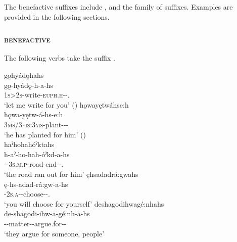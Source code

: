 The benefactive suffixes include , and the  family of suffixes. Examples are provided in the following sections.

\subsubsection{ \textsc{benefactive}} \label{[-hs] (benefactive)}
The following verbs take the  \textsc{\benefactive} suffix .


\ea\label{ex:benefex3}
\ea gǫ̱hyádǫ̱hahs\\
\gll gǫ̱-hyádǫ̱-h-a-hs\\
 \textsc{1s>2s}-write-\textsc{euph.h}-{\joinerA}-\exsc{\benefactive}.{\noaspect} \\
\glt `let me write for you' (\cite{mithun_watewayestanih_1984})
\ex hǫwayętwáhse:h\\
\gll hǫwa-yętw-á-hs-e:h\\
\textsc{3ms/3fis:3ms}-plant-{\joinerA}-{\benefactive}-{\stative}\\
\glt ‘he has planted for him’
(\cite{foster_course_1993})\\

\ex haˀhohahóˀktahs\\
\gll h-aˀ-ho-hah-óˀkd-a-hs\\
 {\translocative}-{\factual}-\textsc{3s.m.p}-road-end-{\joinerA}-{\benefactive}.{\zeropunctual}\\
\glt `the road ran out for him'
\ex ęhsadadrá:gwahs\\
\gll ę-hs-adad-rá:gw-a-hs\\
 \fut-\textsc{2s.a}-{}-choose-{\joinerA}-{\benefactive}.{\zeropunctual}\\
\glt `you will choose for yourself'
\ex deshagodihwagé:nhahs\\
\gll de-shagodi-ihw-a-gé:nh-a-hs\\
 {\dualic}--matter-{\joinerA}-argue.for-{\joinerA}-\\
\glt `they argue for someone, people'

